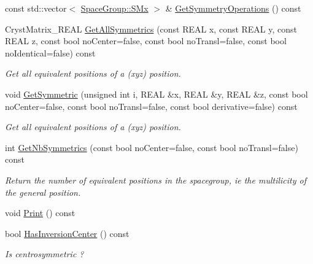 \begin{DoxyCompactItemize}
\item 
const std\+::vector$<$ \mbox{\hyperlink{struct_obj_cryst_1_1_space_group_1_1_s_mx}{Space\+Group\+::\+S\+Mx}} $>$ \& \mbox{\hyperlink{class_obj_cryst_1_1_space_group_ae9e73728272c756ed659cbe3a52b5003}{Get\+Symmetry\+Operations}} () const
\item 
Cryst\+Matrix\+\_\+\+R\+E\+AL \mbox{\hyperlink{class_obj_cryst_1_1_space_group_acda90f46fd5332c08b2915973ae9c1ad}{Get\+All\+Symmetrics}} (const R\+E\+AL x, const R\+E\+AL y, const R\+E\+AL z, const bool no\+Center=false, const bool no\+Transl=false, const bool no\+Identical=false) const
\begin{DoxyCompactList}\small\item\em Get all equivalent positions of a (xyz) position. \end{DoxyCompactList}\item 
void \mbox{\hyperlink{class_obj_cryst_1_1_space_group_ad3108808abdecebd126cf54d811c9b30}{Get\+Symmetric}} (unsigned int i, R\+E\+AL \&x, R\+E\+AL \&y, R\+E\+AL \&z, const bool no\+Center=false, const bool no\+Transl=false, const bool derivative=false) const
\begin{DoxyCompactList}\small\item\em Get all equivalent positions of a (xyz) position. \end{DoxyCompactList}\item 
int \mbox{\hyperlink{class_obj_cryst_1_1_space_group_a3790c6c41b59e2584c48f62ab1766bec}{Get\+Nb\+Symmetrics}} (const bool no\+Center=false, const bool no\+Transl=false) const
\begin{DoxyCompactList}\small\item\em Return the number of equivalent positions in the spacegroup, ie the multilicity of the general position. \end{DoxyCompactList}\item 
void \mbox{\hyperlink{class_obj_cryst_1_1_space_group_a3c71572bb11403564630db165a5ed1cc}{Print}} () const
\item 
\mbox{\label{class_obj_cryst_1_1_space_group_ac297f3135ee0b981d36b44176550f284}} 
bool \mbox{\hyperlink{class_obj_cryst_1_1_space_group_ac297f3135ee0b981d36b44176550f284}{Has\+Inversion\+Center}} () const
\begin{DoxyCompactList}\small\item\em Is centrosymmetric ? \end{DoxyCompactList}\item 

\end{DoxyCompactItemize}
